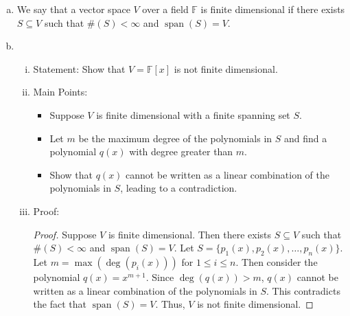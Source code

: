\documentclass{article}
\begin{document}
\begin{enumerate}[a)]
    \item We say that a vector space $V$ over a field $\mathbb{F}$ is finite dimensional if there exists $S \subseteq V$ such that $\#(S) < \infty$ and $\operatorname{span}(S) = V$.
    \item \begin{enumerate}[i)]
        \item Statement: Show that $V = \mathbb{F}[x]$ is not finite dimensional.
        \item Main Points:
        \begin{itemize}
            \item Suppose $V$ is finite dimensional with a finite spanning set $S$.
            \item Let $m$ be the maximum degree of the polynomials in $S$ and find a polynomial $q(x)$ with degree greater than $m$.
            \item Show that $q(x)$ cannot be written as a linear combination of the polynomials in $S$, leading to a contradiction.
        \end{itemize}
        \item Proof: 
        \begin{proof}
            Suppose $V$ is finite dimensional. Then there exists $S \subseteq V$ such that $\#(S) < \infty$ and $\operatorname{span}(S) = V$. Let $S = \{p_1(x), p_2(x), \ldots, p_n(x)\}$. Let $m = \max(\deg(p_i(x)))$ for $1 \leq i \leq n$. Then consider the polynomial $q(x) = x^{m+1}$. Since $\deg(q(x)) > m$, $q(x)$ cannot be written as a linear combination of the polynomials in $S$. This contradicts the fact that $\operatorname{span}(S) = V$. Thus, $V$ is not finite dimensional.
        \end{proof}
        \end{enumerate}


\end{enumerate}
\end{document}
